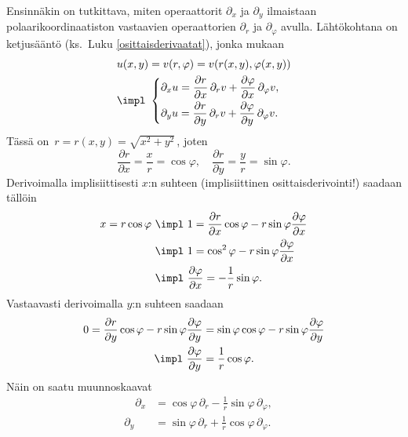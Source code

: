 Ensinnäkin on tutkittava, miten operaattorit $\partial_x$ ja $\partial_y$ ilmaistaan
polaarikoordinaatiston vastaavien operaattorien $\partial_r$ ja $\partial_\varphi$ avulla.
Lähtökohtana on ketjusääntö (ks.\ Luku \ref{osittaisderivaatat}), jonka mukaan
\begin{align*}
&u(x,y)=v(r,\varphi)=v(r(x,y),\varphi(x,y)) \\
&\impl \ \begin{cases}
\partial_x u=\dfrac{\partial r}{\partial x}\,\partial_r v
            +\dfrac{\partial \varphi}{\partial x}\,\partial_\varphi v, \\[2mm]
\partial_y u=\dfrac{\partial r}{\partial y}\,\partial_r v
            +\dfrac{\partial \varphi}{\partial y}\,\partial_\varphi v.
\end{cases}
\end{align*}
Tässä on $\,r=r(x,y)=\sqrt{x^2+y^2}\,$, joten
\[
\frac{\partial r}{\partial x}=\frac{x}{r}=\cos\varphi,\quad 
\frac{\partial r}{\partial y}=\frac{y}{r}=\sin\varphi.
\]
Derivoimalla implisiittisesti $x$:n suhteen (implisiittinen osittaisderivointi!) saadaan tällöin
\begin{align*}
x=r\cos\varphi \ &\impl \ 1=\frac{\partial r}{\partial x}\cos\varphi
                           -r\sin\varphi\frac{\partial\varphi}{\partial x} \\
                 &\impl \ 1=\cos^2\varphi-r\sin\varphi\frac{\partial\varphi}{\partial x} \\
                 &\impl \ \frac{\partial\varphi}{\partial x}=-\frac{1}{r}\sin\varphi.
\end{align*}
Vastaavasti derivoimalla $y$:n suhteen saadaan
\begin{align*}
0=\frac{\partial r}{\partial y}\cos\varphi-r\sin\varphi\frac{\partial\varphi}{\partial y} 
&=\sin\varphi\cos\varphi-r\sin\varphi\frac{\partial\varphi}{\partial y} \\
  \impl \ \frac{\partial\varphi}{\partial y} 
&= \frac{1}{r}\cos\varphi.
\end{align*}
Näin on saatu muunnoskaavat
\[
\boxed{
\begin{aligned}
\quad \partial_x &= \cos\varphi\,\partial_r-\frac{1}{r}\sin\varphi\,\partial_\varphi, \quad \\
      \partial_y &= \sin\varphi\,\partial_r+\frac{1}{r}\cos\varphi\,\partial_\varphi.
\end{aligned}}
\]
